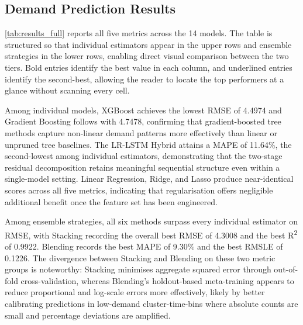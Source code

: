 \documentclass[a4paper,fleqn]{cas-dc}
\begin{document}
\FloatBarrier

\subsection{Demand Prediction Results}

\autoref{tab:results_full} reports all five metrics across the 14 models.  The table is structured so that individual estimators appear in the upper rows and ensemble strategies in the lower rows, enabling direct visual comparison between the two tiers.  Bold entries identify the best value in each column, and underlined entries identify the second-best, allowing the reader to locate the top performers at a glance without scanning every cell.

Among individual models, XGBoost achieves the lowest RMSE of 4.4974 and Gradient Boosting follows with 4.7478, confirming that gradient-boosted tree methods capture non-linear demand patterns more effectively than linear or unpruned tree baselines.  The LR-LSTM Hybrid attains a MAPE of 11.64\%, the second-lowest among individual estimators, demonstrating that the two-stage residual decomposition retains meaningful sequential structure even within a single-model setting.  Linear Regression, Ridge, and Lasso produce near-identical scores across all five metrics, indicating that regularisation offers negligible additional benefit once the feature set has been engineered.

Among ensemble strategies, all six methods surpass every individual estimator on RMSE, with Stacking recording the overall best RMSE of 4.3008 and the best R\textsuperscript{2} of 0.9922.  Blending records the best MAPE of 9.30\% and the best RMSLE of 0.1226.  The divergence between Stacking and Blending on these two metric groups is noteworthy: Stacking minimises aggregate squared error through out-of-fold cross-validation, whereas Blending's holdout-based meta-training appears to reduce proportional and log-scale errors more effectively, likely by better calibrating predictions in low-demand cluster-time-bins where absolute counts are small and percentage deviations are amplified.
\end{document}
